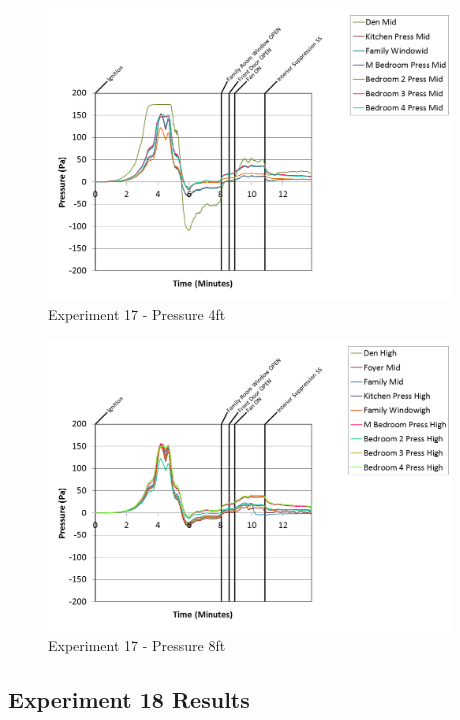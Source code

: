 \documentclass{article}
\begin{document}
\begin{appendices}
\begin{figure}[h!]
	\centering
	\includegraphics[height=3.05in]{0_Images/Results_Charts/Exp_17_Charts/Pressure4ft.png}
	\caption{Experiment 17 - Pressure 4ft}
\end{figure}

\clearpage

\begin{figure}[h!]
	\centering
	\includegraphics[height=3.05in]{0_Images/Results_Charts/Exp_17_Charts/Pressure8ft.png}
	\caption{Experiment 17 - Pressure 8ft}
\end{figure}


\clearpage
\clearpage		\large
\subsection{Experiment 18 Results} \label{App:Exp18Results} 


\end{appendices}
\end{document}
